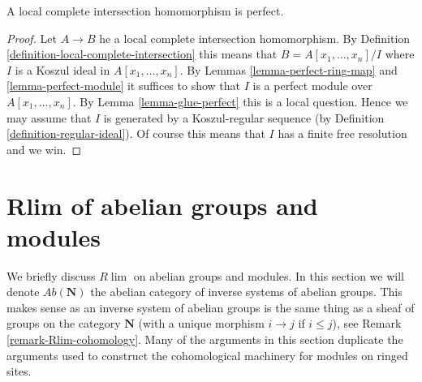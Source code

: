 \begin{lemma}
\label{lemma-lci-perfect}
A local complete intersection homomorphism is perfect.
\end{lemma}

\begin{proof}
Let $A \to B$ he a local complete intersection homomorphism.
By Definition \ref{definition-local-complete-intersection} this
means that $B = A[x_1, \ldots, x_n]/I$ where $I$ is a Koszul ideal
in $A[x_1, \ldots, x_n]$. 
By Lemmas \ref{lemma-perfect-ring-map} and \ref{lemma-perfect-module}
it suffices to show that $I$ is a perfect module over $A[x_1, \ldots, x_n]$.
By Lemma \ref{lemma-glue-perfect} this is a local question. Hence we
may assume that $I$ is generated by a Koszul-regular sequence (by
Definition \ref{definition-regular-ideal}).
Of course this means that $I$ has a finite free resolution and we win.
\end{proof}







\section{Rlim of abelian groups and modules}
\label{section-Rlim}

\noindent
We briefly discuss $R\lim$ on abelian groups and modules.
In this section we will denote $\textit{Ab}(\mathbf{N})$ the
abelian category of inverse systems of abelian groups.
This makes sense as an inverse system of abelian groups is
the same thing as a sheaf of groups on the category $\mathbf{N}$
(with a unique morphism $i \to j$ if $i \leq j$), see
Remark \ref{remark-Rlim-cohomology}. Many of the arguments in this
section duplicate the arguments used to construct the cohomological
machinery for modules on ringed sites.

